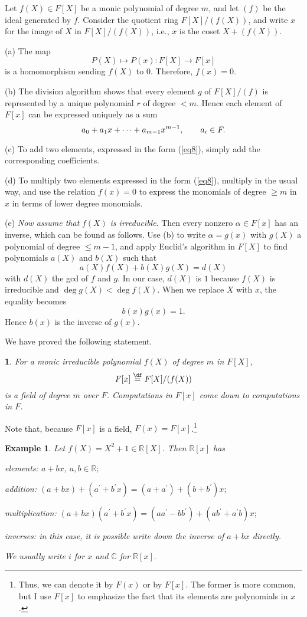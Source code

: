 \documentclass[a4paper,11pt,final,openany]{memoir}
\newtheorem{E}[X]{}
\newtheorem{example}[X]{Example}
\theoremstyle{nonumberplain}
\begin{document}
Let $f(X)\in F[X]$ be a monic polynomial of degree $m$, and let $(f)$ be the
ideal generated by $f$. Consider the quotient ring $F[X]/(f(X))$, and write
$x$ for the image of $X$ in $F[X]/(f(X))$, i.e., $x$ is the coset $X+(f(X))$.

(a) The map
\[
P(X)\mapsto P(x)\colon F[X]\rightarrow F[x]
\]
is a homomorphism sending $f(X)$ to $0$. Therefore, $f(x)=0$.

(b) The division algorithm shows that every element $g$ of $F[X]/(f)$ is
represented by a unique polynomial $r$ of degree $<m$. Hence each element of
$F[x]$ can be expressed uniquely as a sum
\begin{equation}
a_{0}+a_{1}x+\cdots+a_{m-1}x^{m-1},\qquad a_{i}\in F.\hfill\label{eq8}%
\end{equation}


(c) To add two elements, expressed in the form (\ref{eq8}), simply add the
corresponding coefficients.

(d) To multiply two elements expressed in the form (\ref{eq8}), multiply in
the usual way, and use the relation $f(x)=0$ to express the monomials of
degree $\geq m$ in $x$ in terms of lower degree monomials.

(e) \textit{Now assume that} $f(X)$ \textit{is irreducible}. Then every
nonzero $\alpha\in F[x]$ has an inverse, which can be found as follows. Use
(b) to write $\alpha=g(x)$ with $g(X)$ a polynomial of degree $\leq m-1$, and
apply Euclid's algorithm in $F[X]$ to find polynomials $a(X)$ and $b(X)$ such
that
\[
a(X)f(X)+b(X)g(X)=d(X)
\]
with $d(X)$ the gcd of $f$ and $g$. In our case, $d(X)$ is $1$ because $f(X)$
is irreducible and $\deg g(X)<\deg f(X)$. When we replace $X$ with $x$, the
equality becomes
\[
b(x)g(x)=1.
\]
Hence $b(x)$ is the inverse of $g(x)$.

We have proved the following statement.

\begin{E}
\label{ef10m}For a monic irreducible polynomial $f(X)$ of degree $m$ in
$F[X]$,
\[
F[x]\overset{\df}{=}F[X]/(f(X))
\]
is a field of degree $m$ over $F$. Computations in $F[x]$ come down to
computations in $F$.
\end{E}

Note that, because $F[x]$ is a field, $F(x)=F[x]$.\footnote{Thus, we can
denote it by $F(x)$ or by $F[x]$. The former is more common, but I use $F[x]$
to emphasize the fact that its elements are polynomials in $x$.}

\begin{example}
\label{ef11}Let $f(X)=X^{2}+1\in\mathbb{R}[X]$. Then $\mathbb{R}[x]$ has

elements: $a+bx$, $a,b\in\mathbb{R};$

addition: $(a+bx)+(a^{\prime}+b^{\prime}x)=(a+a^{\prime})+(b+b^{\prime})x;$

multiplication: $(a+bx)(a^{\prime}+b^{\prime}x)=(aa^{\prime}-bb^{\prime
})+(ab^{\prime}+a^{\prime}b)x;$

inverses: in this case, it is possible write down the inverse of $a+bx$ directly.

\noindent We usually write $i$ for $x$ and $\mathbb{C}$ for $\mathbb{R}[x].$
\end{example}
\end{document}

